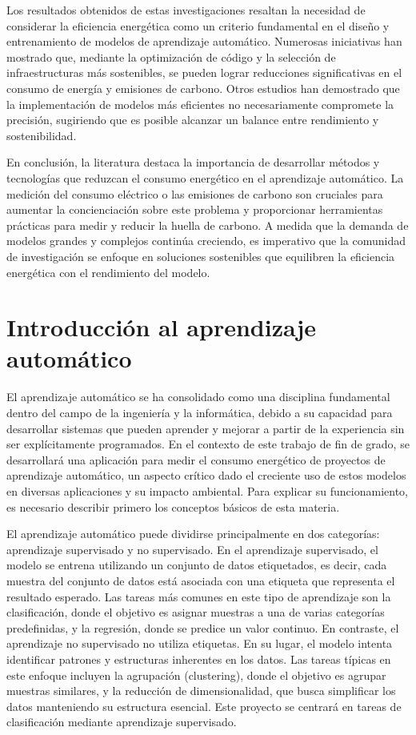Los resultados obtenidos de estas investigaciones resaltan la necesidad de considerar la eficiencia energética como un criterio fundamental en el diseño y entrenamiento de modelos de aprendizaje automático. Numerosas iniciativas han mostrado que, mediante la optimización de código y la selección de infraestructuras más sostenibles, se pueden lograr reducciones significativas en el consumo de energía y emisiones de carbono. Otros estudios han demostrado que la implementación de modelos más eficientes no necesariamente compromete la precisión, sugiriendo que es posible alcanzar un balance entre rendimiento y sostenibilidad.

En conclusión, la literatura destaca la importancia de desarrollar métodos y tecnologías que reduzcan el consumo energético en el aprendizaje automático. La medición del consumo eléctrico o las emisiones de carbono son cruciales para aumentar la concienciación sobre este problema y proporcionar herramientas prácticas para medir y reducir la huella de carbono. A medida que la demanda de modelos grandes y complejos continúa creciendo, es imperativo que la comunidad de investigación se enfoque en soluciones sostenibles que equilibren la eficiencia energética con el rendimiento del modelo.

\section{Introducción al aprendizaje automático}
\label{sec:intro-ml}

El aprendizaje automático se ha consolidado como una disciplina fundamental dentro del campo de la ingeniería y la informática, debido a su capacidad para desarrollar sistemas que pueden aprender y mejorar a partir de la experiencia sin ser explícitamente programados. En el contexto de este trabajo de fin de grado, se desarrollará una aplicación para medir el consumo energético de proyectos de aprendizaje automático, un aspecto crítico dado el creciente uso de estos modelos en diversas aplicaciones y su impacto ambiental. Para explicar su funcionamiento, es necesario describir primero los conceptos básicos de esta materia.

El aprendizaje automático puede dividirse principalmente en dos categorías: aprendizaje supervisado y no supervisado. En el aprendizaje supervisado, el modelo se entrena utilizando un conjunto de datos etiquetados, es decir, cada muestra del conjunto de datos está asociada con una etiqueta que representa el resultado esperado. Las tareas más comunes en este tipo de aprendizaje son la clasificación, donde el objetivo es asignar muestras a una de varias categorías predefinidas, y la regresión, donde se predice un valor continuo. 
En contraste, el aprendizaje no supervisado no utiliza etiquetas. En su lugar, el modelo intenta identificar patrones y estructuras inherentes en los datos. Las tareas típicas en este enfoque incluyen la agrupación (clustering), donde el objetivo es agrupar muestras similares, y la reducción de dimensionalidad, que busca simplificar los datos manteniendo su estructura esencial. Este proyecto se centrará en tareas de clasificación mediante aprendizaje supervisado.

